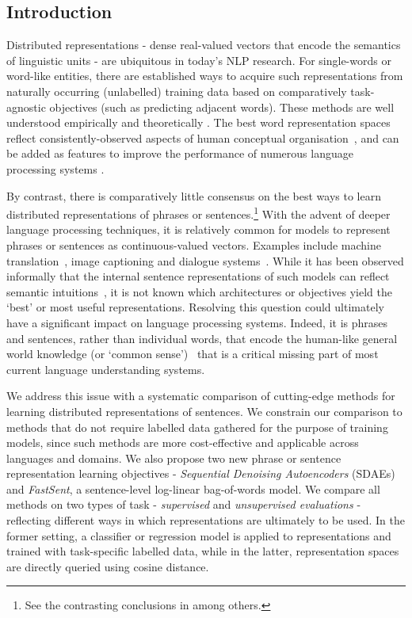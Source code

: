 

\subsection{Introduction}

Distributed representations - dense real-valued vectors that encode the semantics of linguistic units - are ubiquitous in today's NLP research. For single-words or word-like entities, there are established ways to acquire such representations from naturally occurring (unlabelled) training data based on comparatively task-agnostic objectives (such as predicting adjacent words). These methods are well understood empirically \cite{baroni2014don} and theoretically \cite{levy2014neural}. The best word representation spaces reflect consistently-observed aspects of human conceptual organisation~\cite{hill2014simlex}, and can be added as features to improve the performance of numerous language processing systems \cite{collobert2011natural}. 

By contrast, there is comparatively little consensus on the best ways to learn distributed representations of phrases or sentences.\footnote{See the contrasting conclusions in \cite{mitchell2008vector,clark2007combining,baroni2014frege,milajevs2014evaluating} among others.} With the advent of deeper language processing techniques, it is relatively common for models to represent phrases or sentences as continuous-valued vectors. Examples include machine translation~\cite{Sutskever2014sequence}, image captioning \cite{mao2014deep} and dialogue systems~\cite{serban2015building}. While it has been observed informally that the internal sentence representations of such models can reflect semantic intuitions~\cite{cho2014learning}, it is not known which architectures or objectives yield the `best' or most useful representations. Resolving this question could ultimately have a significant impact on language processing systems. Indeed, it is phrases and sentences, rather than individual words, that encode the human-like general world knowledge (or `common sense')~\cite{norman1972memory} that is a critical missing part of most current language understanding systems.

We address this issue with a systematic comparison of cutting-edge methods for learning distributed representations of sentences. We constrain our comparison to methods that do not require labelled data gathered for the purpose of training models, since such methods are more cost-effective and applicable across languages and domains. We also propose two new phrase or sentence representation learning objectives - \emph{Sequential Denoising Autoencoders} (SDAEs) and \emph{FastSent}, a sentence-level log-linear bag-of-words model. We compare all methods on two types of task - \emph{supervised} and \emph{unsupervised evaluations} - reflecting different ways in which representations are ultimately to be used. In the former setting, a classifier or regression model is applied to representations and trained with task-specific labelled data, while in the latter, representation spaces are directly queried using cosine distance.    

